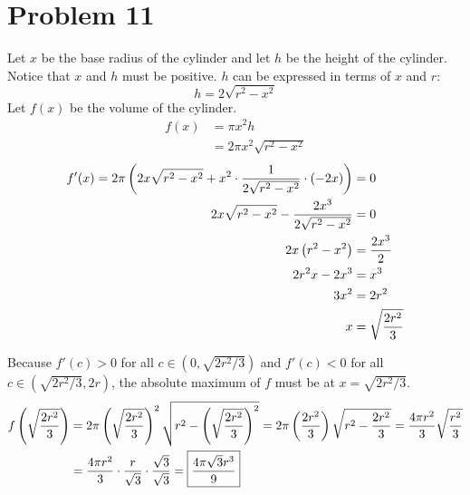 \documentclass{article}
\newcommand*{\paren}[1]{\ensuremath\left(#1\right)}
\newcommand*{\problem}[1]{\section*{Problem #1}}
\begin{document}
\problem{11}
Let $x$ be the base radius of the cylinder and let $h$ be the height of the cylinder. Notice that $x$ and $h$ must be positive. $h$ can be expressed in terms of $x$ and $r$:
\begin{equation*}
	h=2\sqrt{r^2-x^2}
\end{equation*}
Let $f(x)$ be the volume of the cylinder.
\begin{align*}
	f(x)&=\pi x^2h \\
	&=2\pi x^2\sqrt{r^2-x^2}
\end{align*}
\begin{align*}
	f'(x)=2\pi\paren{2x\sqrt{r^2-x^2}+x^2\cdot\frac{1}{2\sqrt{r^2-x^2}}\cdot(-2x)}&=0 \\
	2x\sqrt{r^2-x^2}-\frac{2x^3}{2\sqrt{r^2-x^2}}&=0 \\
	2x\paren{r^2-x^2}&=\frac{2x^3}{2} \\
	2r^2x-2x^3&=x^3 \\
	3x^2&=2r^2 \\
	x&=\sqrt{\frac{2r^2}{3}}
\end{align*}
\begin{center}
\end{center}
Because $f'(c)>0$ for all $c\in(0,\sqrt{2r^2/3})$ and $f'(c)<0$ for all $c\in(\sqrt{2r^2/3},2r)$, the absolute maximum of $f$ must be at $x=\sqrt{2r^2/3}$.
\begin{align*}
	f\paren{\sqrt{\frac{2r^2}{3}}}
	&=2\pi\paren{\sqrt{\frac{2r^2}{3}}}^2\sqrt{r^2-\paren{\sqrt{\frac{2r^2}{3}}}^2}
	=2\pi\paren{\frac{2r^2}{3}}\sqrt{r^2-\frac{2r^2}{3}}
	=\frac{4\pi r^2}{3}\sqrt{\frac{r^2}{3}} \\
	&=\frac{4\pi r^2}{3}\cdot\frac{r}{\sqrt{3}}\cdot\frac{\sqrt{3}}{\sqrt{3}}
	=\boxed{\frac{4\pi\sqrt{3}r^3}{9}}
\end{align*}
\end{document}
